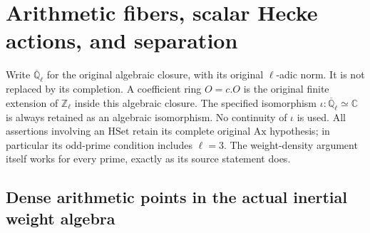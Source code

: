 \section{Arithmetic fibers, scalar Hecke actions, and separation}
\label{sec:arithmetic-fibers-v43}


Write $\overline{\mathbb Q}_\ell$ for the original algebraic closure,
with its original $\ell$-adic norm.  It is not replaced by its
completion.  A coefficient ring $O=c.O$ is the original finite
extension of $\mathbb Z_\ell$ inside this algebraic closure.  The
specified isomorphism $\iota:\overline{\mathbb Q}_\ell\simeq\mathbb C$
is always retained as an algebraic isomorphism.  No continuity of
$\iota$ is used.  All assertions involving an $\mathrm{HSet}$ retain
its complete original $\mathrm{Ax}$ hypothesis; in particular its
odd-prime condition includes $\ell=3$.  The weight-density argument
itself works for every prime, exactly as its source statement does.

\subsection{Dense arithmetic points in the actual inertial weight algebra}

